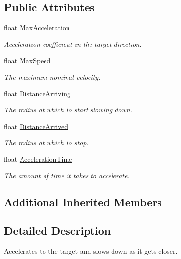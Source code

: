 \subsection*{Public Attributes}
\begin{DoxyCompactItemize}
\item 
float \hyperlink{class_skyrates_1_1_a_i_1_1_steering_1_1_basic_1_1_arrive_ac17fbcbc0b427a93ed44b0c383a9e811}{Max\-Acceleration}
\begin{DoxyCompactList}\small\item\em Acceleration coefficient in the target direction. \end{DoxyCompactList}\item 
float \hyperlink{class_skyrates_1_1_a_i_1_1_steering_1_1_basic_1_1_arrive_a2939d630dada02a8d58d090c2e0b0d54}{Max\-Speed}
\begin{DoxyCompactList}\small\item\em The maximum nominal velocity. \end{DoxyCompactList}\item 
float \hyperlink{class_skyrates_1_1_a_i_1_1_steering_1_1_basic_1_1_arrive_aa5d253b4b0b808defa2c70e3a1a18222}{Distance\-Arriving}
\begin{DoxyCompactList}\small\item\em The radius at which to start slowing down. \end{DoxyCompactList}\item 
float \hyperlink{class_skyrates_1_1_a_i_1_1_steering_1_1_basic_1_1_arrive_a6fe22533b2f3f3156418a40be017a012}{Distance\-Arrived}
\begin{DoxyCompactList}\small\item\em The radius at which to stop. \end{DoxyCompactList}\item 
float \hyperlink{class_skyrates_1_1_a_i_1_1_steering_1_1_basic_1_1_arrive_a66e0424af3a3a898f2abdd9f3509813f}{Acceleration\-Time}
\begin{DoxyCompactList}\small\item\em The amount of time it takes to accelerate. \end{DoxyCompactList}\end{DoxyCompactItemize}
\subsection*{Additional Inherited Members}


\subsection{Detailed Description}
Accelerates to the target and slows down as it gets closer. 

